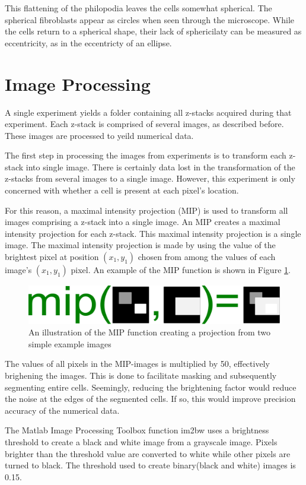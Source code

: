 \documentclass[ twocolumn,notitlepage]{ revtex4-1}
\begin{document}
This flattening of the philopodia leaves the cells somewhat spherical. The spherical fibroblasts appear as circles when seen through the microscope. While the cells return to a spherical shape, their lack of sphericilaty can be measured as eccentricity, as in the eccentricty of an ellipse.

\section*{Image Processing}
A single experiment yields a folder containing all z-stacks acquired during that experiment. Each z-stack is comprised of several images, as described before. These images are processed to yeild numerical data.

The first step in processing the images from experiments is to transform each z-stack into single image. There is certainly data lost in the transformation of the z-stacks from several images to a single image. However, this experiment is only concerned with whether a cell is present at each pixel's location.

For this reason, a maximal intensity projection (MIP) is used to transform all images comprising a z-stack into a single image. An MIP creates a maximal intensity projection for each z-stack. This maximal intensity projection is a single image. The maximal intensity projection is made by using the value of the brightest pixel at position $(x_1,y_1)$ chosen from among the values of each image's $(x_1,y_1)$ pixel. An example of the MIP function is shown in Figure \ref{fig:mip-illustration}.

\begin{figure}[!h]
\includegraphics[width=.4\textwidth]{./img/mip-illustration.pdf}
\caption{\label{fig:mip-illustration}An illustration of the MIP function creating a projection from two simple example images}
\end{figure}

The values of all pixels in the MIP-images is multiplied by 50, effectively brighening the images. This is done to facilitate masking and subsequently segmenting entire cells. Seemingly, reducing the brightening factor would reduce the noise at the edges of the segmented cells. If so, this would improve precision accuracy of the numerical data.

The Matlab Image Processing Toolbox function im2bw uses a brightness threshold to create a black and white image from a grayscale image. Pixels brighter than the threshold value are converted to white while other pixels are turned to black. The threshold used to create binary(black and white) images is 0.15.
\end{document}

